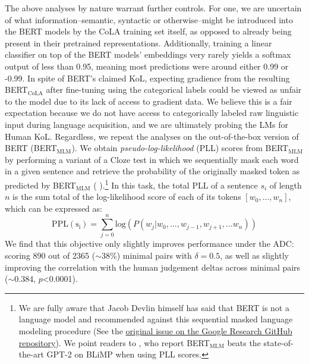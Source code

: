 The above analyses by nature warrant further controls.  For one, we are uncertain of what information--semantic, syntactic or otherwise--might be introduced into the BERT models by the CoLA training set itself, as opposed to already being present in their pretrained representations.  Additionally, training a linear classifier on top of the BERT models' embeddings very rarely yields a softmax output of less than 0.95, meaning most predictions were around either 0.99 or -0.99.  In spite of BERT's claimed KoL, expecting gradience from the resulting BERT$_\mathrm{CoLA}$ after fine-tuning using the categorical labels could be viewed as unfair to the model due to its lack of access to gradient data.  We believe this is a fair expectation because we do not have access to categorically labeled raw linguistic input during language acquisition, and we are ultimately probing the LMs for Human KoL.  Regardless, we repeat the analyses on the out-of-the-box version of BERT (BERT$_\mathrm{MLM}$).  We obtain \textit{pseudo-log-likelihood} (PLL) scores from BERT$_\mathrm{MLM}$ by performing a variant of a Cloze test in which we sequentially mask each word in a given sentence and retrieve the probability of the originally masked token as predicted by BERT$_\mathrm{MLM}$ (\citealp{wang2019bert,shin2019effective,salazar2020} ).\footnote{We are fully aware that Jacob Devlin himself has said that BERT is not a language model and recommended against this sequential masked language modeling procedure (See the \href{https://github.com/google-research/bert/issues/35}{original issue on the Google Research GitHub repository}).  We point readers to \citet{salazar2020}, who report BERT$_\mathrm{MLM}$ beats the state-of-the-art GPT-2 on BLiMP \citep{warstadt2019blimp} when using PLL scores.}  In this task, the total PLL of a sentence $s_i$ of length $n$ is the sum total of the log-likelihood score of each of its tokens $[w_0,...,w_n]$, which can be expressed as:
\begin{equation}
    \mathrm{PPL(s_i)} = \sum^{n}_{j=0} \mathrm{log}(P(w_j|w_0,...,w_{j-1},w_{j+1},...w_n))
    \label{eqn:pseudo_log_likelihood}
\end{equation}
We find that this objective only slightly improves performance under the ADC: scoring 890 out of 2365 ($\sim$38\%) minimal pairs with $\delta = 0.5$, as well as slightly improving the correlation with the human judgement deltas across minimal pairs ($\sim$0.384, $p$<0.0001).  

